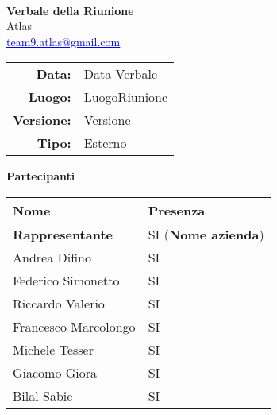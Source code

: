 \documentclass[a4paper,12pt]{article}
\makeatletter
\newcommand{\Gruppo}{Atlas}
\newcommand{\Email}{\href{mailto:team9.atlas@gmail.com}{\textcolor{blue}{\underline{team9.atlas@gmail.com}}}}
\newcommand{\TitoloVerbale}{Verbale della Riunione}
\newcommand{\DataVerbale}{Data Verbale}
\newcommand{\LuogoVerbale}{LuogoRiunione}
\newcommand{\LogoGruppo}{img/AtlasLogo.png} %
\newcommand{\VersioneVerbale}{Versione} %
\newcommand{\VerbaleEsterno}{Esterno}
\makeatother
\begin{document}
\begin{titlepage}
    \centering

    \vspace*{0cm}
    \\
    [.5cm]
    {\Huge \textbf{\TitoloVerbale}}\\[0.8cm]
    {\LARGE \Gruppo}\\[0.1cm]
    {\Email}\\[1.2cm]

    \begin{tabular}{rl}
        \textbf{Data:} & \DataVerbale \\
        \textbf{Luogo:} & \LuogoVerbale \\
        \textbf{Versione:} & \VersioneVerbale \\
        \textbf{Tipo:} & \VerbaleEsterno \\
    \end{tabular}

    \vspace{1.2cm}

    {\large \textbf{Partecipanti}}\\[0.5cm]
    \begin{tabular}{l|l}
        \textbf{Nome} & \textbf{Presenza} \\
        \hline
        \textbf{Rappresentante} & SI (\textbf{Nome azienda})\\
        Andrea Difino & SI \\
        Federico Simonetto & SI \\
        Riccardo Valerio & SI \\
        Francesco Marcolongo & SI \\
        Michele Tesser & SI \\
        Giacomo Giora & SI \\
        Bilal Sabic & SI \\
    \end{tabular}

\end{titlepage}
\end{document}
